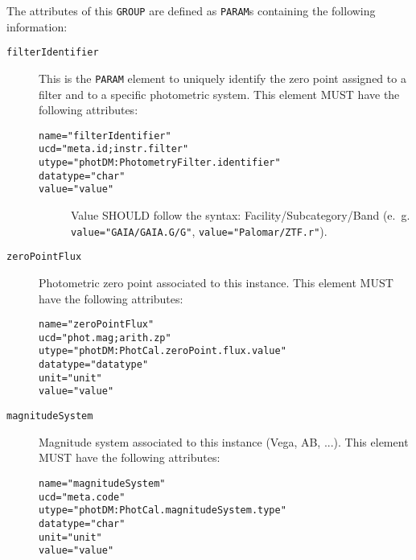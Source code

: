 \documentclass[11pt,a4paper]{ivoa}
\let\fg=\color
\def\elem#1{{\tt{\fg{DarkRed}#1}}}
\def\attrval#1#2{{\tt{\fg{DarkRed}#1}="{\fg{DarkPurple}#2}"}}
\begin{document}
The attributes of this \elem{GROUP} are defined as \elem{PARAM}s containing the following information: 
\begin{description}
\item[\elem{filterIdentifier}] This is the \elem{PARAM} element to uniquely identify the zero point assigned to a filter and to a specific photometric system. This element MUST have the following attributes:
\begin{description}
    \item[\attrval{name}{filterIdentifier}]
    \item[\attrval{ucd}{meta.id;instr.filter}]
    \item[\attrval{utype}{photDM:PhotometryFilter.identifier}]
    \item[\attrval{datatype}{char}]
    \item[\attrval{value}{value}] Value SHOULD follow the syntax: Facility/Subcategory/Band (e.~g. \attrval{value}{GAIA/GAIA.G/G}, \attrval{value}{Palomar/ZTF.r}). 
\end{description}
\item[\elem{zeroPointFlux}] Photometric zero point associated to this instance. This element MUST have the following attributes:
\begin{description}
    \item[\attrval{name}{zeroPointFlux}]
    \item[\attrval{ucd}{phot.mag;arith.zp}]
    \item[\attrval{utype}{photDM:PhotCal.zeroPoint.flux.value}]
    \item[\attrval{datatype}{datatype}]
    \item[\attrval{unit}{unit}]
    \item[\attrval{value}{value}]
\end{description}
\item[\elem{magnitudeSystem}] Magnitude system associated to this instance (Vega, AB, ...). This element MUST have the following attributes:
\begin{description}
    \item[\attrval{name}{magnitudeSystem}]
    \item[\attrval{ucd}{meta.code}] 
    \item[\attrval{utype}{photDM:PhotCal.magnitudeSystem.type}]
    \item[\attrval{datatype}{char}]
    \item[\attrval{unit}{unit}]
    \item[\attrval{value}{value}]
\end{description}

\end{description}
\end{document}
